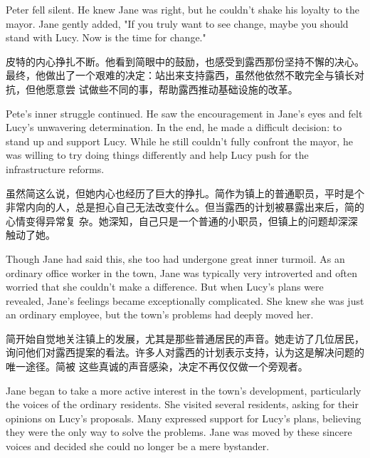 \begin{flushright}
    Peter fell silent. He knew Jane was right, but he couldn’t shake his loyalty to
    the mayor. Jane gently added, "If you truly want to see change, maybe you
    should stand with Lucy. Now is the time for change."
\end{flushright}

皮特的内心挣扎不断。他看到简眼中的鼓励，也感受到露西那份坚持不懈的决心。最终，他做出了一个艰难的决定：站出来支持露西，虽然他依然不敢完全与镇长对抗，但他愿意尝
试做些不同的事，帮助露西推动基础设施的改革。

\begin{flushright}
    Pete’s inner struggle continued. He saw the encouragement in Jane’s eyes and
    felt Lucy's unwavering determination. In the end, he made a difficult decision:
    to stand up and support Lucy. While he still couldn’t fully confront the mayor,
    he was willing to try doing things differently and help Lucy push for the
    infrastructure reforms.
\end{flushright}

虽然简这么说，但她内心也经历了巨大的挣扎。简作为镇上的普通职员，平时是个非常内向的人，总是担心自己无法改变什么。但当露西的计划被暴露出来后，简的心情变得异常复
杂。她深知，自己只是一个普通的小职员，但镇上的问题却深深触动了她。

\begin{flushright}
    Though Jane had said this, she too had undergone great inner turmoil. As an
    ordinary office worker in the town, Jane was typically very introverted and
    often worried that she couldn't make a difference. But when Lucy’s plans were
    revealed, Jane's feelings became exceptionally complicated. She knew she was
    just an ordinary employee, but the town’s problems had deeply moved her.
\end{flushright}

简开始自觉地关注镇上的发展，尤其是那些普通居民的声音。她走访了几位居民，询问他们对露西提案的看法。许多人对露西的计划表示支持，认为这是解决问题的唯一途径。简被
这些真诚的声音感染，决定不再仅仅做一个旁观者。

\begin{flushright}
    Jane began to take a more active interest in the town’s development,
    particularly the voices of the ordinary residents. She visited several
    residents, asking for their opinions on Lucy’s proposals. Many expressed
    support for Lucy’s plans, believing they were the only way to solve the
    problems. Jane was moved by these sincere voices and decided she could no
    longer be a mere bystander.
\end{flushright}


